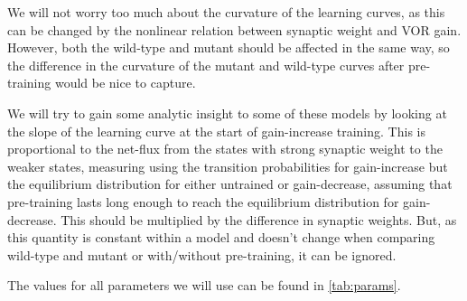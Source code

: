 \documentclass[12pt]{article}
\begin{document}
We will not worry too much about the curvature of the learning curves, as this can be changed by the nonlinear relation between synaptic weight and VOR gain.
However, both the wild-type and mutant should be affected in the same way, so the difference in the curvature of the mutant and wild-type curves after pre-training would be nice to capture.

We will try to gain some analytic insight to some of these models by looking at the slope of the learning curve at the start of gain-increase training.
This is proportional to the net-flux from the states with strong synaptic weight to the weaker states, measuring using the transition probabilities for gain-increase but the equilibrium distribution for either untrained or gain-decrease, assuming that pre-training lasts long enough to reach the equilibrium distribution for gain-decrease.
This should be multiplied by the difference in synaptic weights.
But, as this quantity is constant within a model and doesn't change when comparing wild-type and mutant or with/without pre-training, it can be ignored.

The values for all parameters we will use can be found in \autoref{tab:params}.
\end{document}
